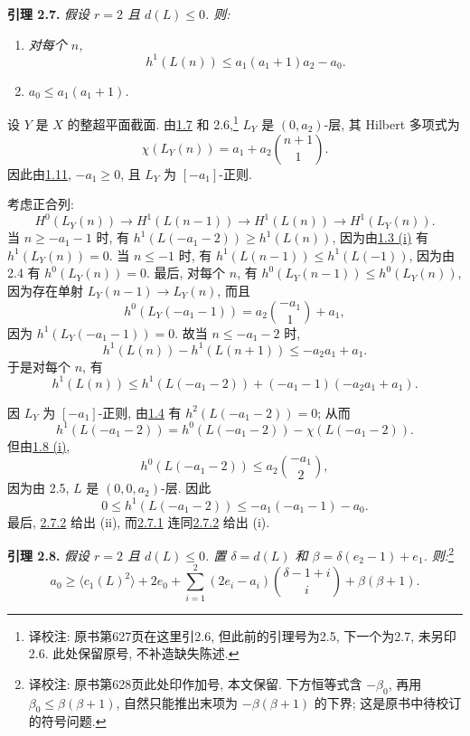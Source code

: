 \textbf{引理 2.7.} \emph{假设 \(r=2\) 且 \(d(L)\le0\). 则:}
\begin{enumerate}[label=(\roman*)]
\item \emph{对每个 \(n\),
\[
h^1(L(n))\le a_1(a_1+1)a_2-a_0.
\]}
\item \emph{\(a_0\le a_1(a_1+1)\).}
\end{enumerate}

设 \(Y\) 是 \(X\) 的整超平面截面. 由\hyperlink{sga6.e13.lem.1-7}{1.7} 和 2.6,\footnote{译校注: 原书第627页在这里引2.6, 但此前的引理号为2.5, 下一个为2.7, 未另印2.6. 此处保留原号, 不补造缺失陈述.} \(L_Y\) 是 \((0,a_2)\)-层, 其 Hilbert 多项式为
\[
\chi(L_Y(n))=a_1+a_2\binom{n+1}{1}.
\]
因此由\hyperlink{sga6.e13.thm.1-11}{1.11}, \(-a_1\ge0\), 且 \(L_Y\) 为 \([-a_1]\)-正则.

考虑正合列:
\[
H^0(L_Y(n))\longrightarrow H^1(L(n-1))
\longrightarrow H^1(L(n))\longrightarrow H^1(L_Y(n)).
\]
当 \(n\ge-a_1-1\) 时, 有 \(h^1(L(-a_1-2))\ge h^1(L(n))\), 因为由\hyperlink{sga6.e13.prop.1-3}{1.3 (i)} 有 \(h^1(L_Y(n))=0\). 当 \(n\le-1\) 时, 有 \(h^1(L(n-1))\le h^1(L(-1))\), 因为由 2.4 有 \(h^0(L_Y(n))=0\). 最后, 对每个 \(n\), 有 \(h^0(L_Y(n-1))\le h^0(L_Y(n))\), 因为存在单射 \(L_Y(n-1)\to L_Y(n)\), 而且
\[
h^0(L_Y(-a_1-1))=a_2\binom{-a_1}{1}+a_1,
\]
因为 \(h^1(L_Y(-a_1-1))=0\). 故当 \(n\le-a_1-2\) 时,
\[
h^1(L(n))-h^1(L(n+1))\le -a_2a_1+a_1.
\]
于是对每个 \(n\), 有
\begin{equation}
h^1(L(n))\le
h^1(L(-a_1-2))+(-a_1-1)(-a_2a_1+a_1).
\tag{2.7.1}
\end{equation}

因 \(L_Y\) 为 \([-a_1]\)-正则, 由\hyperlink{sga6.e13.prop.1-4}{1.4} 有 \(h^2(L(-a_1-2))=0\); 从而
\[
h^1(L(-a_1-2))
=h^0(L(-a_1-2))-\chi(L(-a_1-2)).
\]
但由\hyperlink{sga6.e13.prop.1-8}{1.8 (i)},
\[
h^0(L(-a_1-2))\le a_2\binom{-a_1}{2},
\]
因为由 2.5, \(L\) 是 \((0,0,a_2)\)-层. 因此
\begin{equation}
0\le h^1(L(-a_1-2))\le -a_1(-a_1-1)-a_0.
\tag{2.7.2}
\end{equation}
最后, \hyperlink{sga6.e13.eq.2-6-2}{2.7.2} 给出 (ii), 而\hyperlink{sga6.e13.eq.2-6-1}{2.7.1} 连同\hyperlink{sga6.e13.eq.2-6-2}{2.7.2} 给出 (i).

\textbf{引理 2.8.} \emph{假设 \(r=2\) 且 \(d(L)\le0\). 置 \(\delta=d(L)\) 和 \(\beta=\delta(e_2-1)+e_1\). 则:}\footnote{译校注: 原书第628页此处印作加号, 本文保留. 下方恒等式含 $-\beta_0$, 再用 $\beta_0\leq\beta(\beta+1)$, 自然只能推出末项为 $-\beta(\beta+1)$ 的下界; 这是原书中待校订的符号问题.}
\[
a_0\ge
\bigl\langle c_1(L)^2\bigr\rangle+2e_0
+\sum_{i=1}^{2}(2e_i-a_i)\binom{\delta-1+i}{i}
+\beta(\beta+1).
\]


